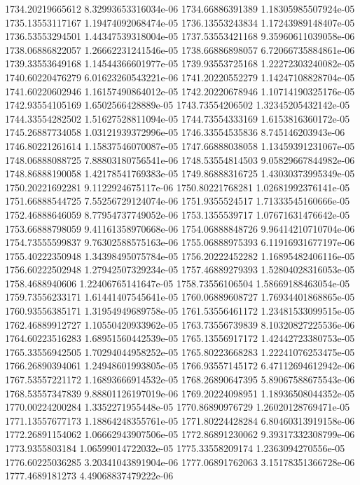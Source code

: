 {1734.20219665612 8.32993653316034e-06
1734.66886391389 1.18305985507924e-05
1735.13553117167 1.19474092068474e-05
1736.13553243834 1.17243989148407e-05
1736.53553294501 1.44347539318004e-05
1737.53553421168 9.35960611039058e-06
1738.06886822057 1.26662231241546e-05
1738.66886898057 6.72066735884861e-06
1739.33553649168 1.14544366601977e-05
1739.93553725168 1.22272303240082e-05
1740.60220476279 6.01623260543221e-06
1741.20220552279 1.14247108828704e-05
1741.60220602946 1.16157490864012e-05
1742.20220678946 1.10714190325176e-05
1742.93554105169 1.6502566428889e-05
1743.73554206502 1.32345205432142e-05
1744.33554282502 1.51627528811094e-05
1744.73554333169 1.6153816360172e-05
1745.26887734058 1.03121939372996e-05
1746.33554535836 8.745146203943e-06
1746.80221261614 1.15837546070087e-05
1747.66888038058 1.13459391231067e-05
1748.06888088725 7.88803180756541e-06
1748.53554814503 9.05829667844982e-06
1748.86888190058 1.42178541769383e-05
1749.86888316725 1.43030373995349e-05
1750.20221692281 9.1122924675117e-06
1750.80221768281 1.02681992376141e-05
1751.66888544725 7.55256729124074e-06
1751.9355524517 1.71333545160666e-05
1752.46888646059 8.77954737749052e-06
1753.1355539717 1.07671631476642e-05
1753.66888798059 9.41161358970668e-06
1754.06888848726 9.96414210710704e-06
1754.73555599837 9.76302588575163e-06
1755.06888975393 6.11916931677197e-06
1755.40222350948 1.34398495075784e-05
1756.20222452282 1.16895482406116e-05
1756.60222502948 1.27942507329234e-05
1757.46889279393 1.52804028316053e-05
1758.4688940606 1.22406765141647e-05
1758.73556106504 1.58669188463054e-05
1759.73556233171 1.61441407545641e-05
1760.06889608727 1.76934401868865e-05
1760.93556385171 1.31954949689758e-05
1761.53556461172 1.23481533099515e-05
1762.46889912727 1.10550420933962e-05
1763.73556739839 8.10320827225536e-06
1764.60223516283 1.68951560442539e-05
1765.13556917172 1.42442723380753e-05
1765.33556942505 1.70294044958252e-05
1765.80223668283 1.22241076253475e-05
1766.26890394061 1.24948601993805e-05
1766.93557145172 6.47112694612942e-06
1767.53557221172 1.16893666914532e-05
1768.26890647395 5.89067588675543e-06
1768.53557347839 9.88801126197019e-06
1769.20224098951 1.18936508044352e-05
1770.00224200284 1.3352271955448e-05
1770.86890976729 1.26020128769471e-05
1771.13557677173 1.18864248355761e-05
1771.80224428284 6.80460313919158e-06
1772.26891154062 1.06662943907506e-05
1772.86891230062 9.39317332308799e-06
1773.9355803184 1.06599014722032e-05
1775.33558209174 1.2363094270556e-05
1776.60225036285 3.20341043891904e-06
1777.06891762063 3.15178351366728e-06
1777.4689181273 4.49068837479222e-06
}
